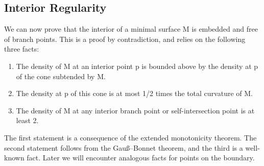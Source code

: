 \documentclass[a4paper, 11pt]{article}
\theoremstyle{plain}
\theoremstyle{definition}
\theoremstyle{remark}
\DeclareMathOperator{\diff}{d \!}
\numberwithin{equation}{subsection}
\def\({}
\def\){}
\def\pi{}
\begin{document}
\begin{comment}
We now split the two integrals by writing \(\partial M_{r}\) as the union of \(M \cap \partial B(0,r)\) and \(\Gamma_{r}\). Similarly, \(\partial E_{r}\) is the union of \(E \cap \partial B(0,r)\) and \(\Gamma_{r}\). Recombining these in the obvious way, we have
\begin{equation}
n \mathcal{H}^{n}(M_{r}') \leqslant \int_{\partial M'_{r}} \langle x, \nu_{\partial \tilde{M}_{r}} \rangle \diff \mathcal{H}^{n-1}(x) + \int_{\Gamma_{r}} \langle x, \nu_{\partial M_{r}} + \nu_{\partial E_{r}} \rangle \diff \mathcal{H}^{n-1}(x).
\end{equation}
The second integral is everywhere non-positive, so
\begin{equation}
nA(r) = n \mathcal{H}^{n}(M_{r}') \leqslant \int_{\partial M_{r}'} \langle x, \nu_{\partial M_{r}'} \rangle \diff \mathcal{H}^{n-1}(x) \leqslant rL(r).
\end{equation}
We can now combine this with \(A'(r) \geqslant L(r)\) to obtain
\begin{equation}
A'(r) - nr^{-1}A(r) \geqslant 0,
\end{equation}
so \(\frac{\!\diff}{\diff r} (r^{-n}A(r)) \geqslant 0\). But \(r^{-n}A(r)\) is exactly the density ratio (up to a constant multiple of \(\omega_{n}\)), so we are done.
\end{proof}
\end{comment}

\subsection{Interior Regularity}

We can now prove that the interior of a minimal surface \(M\) is embedded and free of branch points. This is a proof by contradiction, and relies on the following three facts:
\begin{enumerate}
\item The density of \(M\) at an interior point \(p\) is bounded above by the density at \(p\) of the cone subtended by \(\partial M\).
\item The density at \(p\) of this cone is at most \(1/2\pi\) times the total curvature of \(\partial M\).
\item The density of \(M\) at any interior branch point or self-intersection point is at least \(2\).
\end{enumerate}
The first statement is a consequence of the extended monotonicity theorem. The second statement follows from the Gau\ss --Bonnet theorem, and the third is a well-known fact. Later we will encounter analogous facts for points on the boundary.
\end{document}
